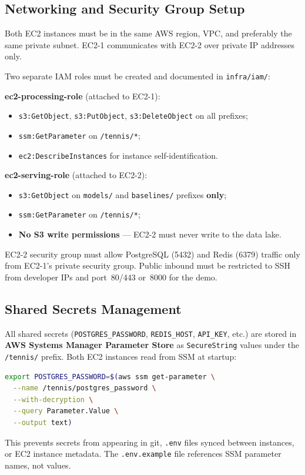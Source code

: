 \documentclass[11pt,a4paper]{article}
\begin{document}
\subsection{Networking and Security Group Setup}

Both EC2 instances must be in the same AWS region, VPC, and preferably the same private subnet.
EC2-1 communicates with EC2-2 over private IP addresses only.

\begin{criticalbox}
Two separate IAM roles must be created and documented in \texttt{infra/iam/}:

\textbf{ec2-processing-role} (attached to EC2-1):
\begin{itemize}[nosep]
  \item \texttt{s3:GetObject}, \texttt{s3:PutObject}, \texttt{s3:DeleteObject} on all prefixes;
  \item \texttt{ssm:GetParameter} on \texttt{/tennis/*};
  \item \texttt{ec2:DescribeInstances} for instance self-identification.
\end{itemize}

\textbf{ec2-serving-role} (attached to EC2-2):
\begin{itemize}[nosep]
  \item \texttt{s3:GetObject} on \texttt{models/} and \texttt{baselines/} prefixes \textbf{only};
  \item \texttt{ssm:GetParameter} on \texttt{/tennis/*};
  \item \textbf{No S3 write permissions} --- EC2-2 must never write to the data lake.
\end{itemize}

EC2-2 security group must allow PostgreSQL (5432) and Redis (6379) traffic only from EC2-1's
private security group. Public inbound must be restricted to SSH from developer IPs and
port~80/443 or~8000 for the demo.
\end{criticalbox}

\subsection{Shared Secrets Management}

\begin{importantbox}
All shared secrets (\texttt{POSTGRES\_PASSWORD}, \texttt{REDIS\_HOST}, \texttt{API\_KEY}, etc.)
are stored in \textbf{AWS Systems Manager Parameter Store} as \texttt{SecureString} values under
the \texttt{/tennis/} prefix. Both EC2 instances read from SSM at startup:

\begin{lstlisting}[language=bash]
export POSTGRES_PASSWORD=$(aws ssm get-parameter \
  --name /tennis/postgres_password \
  --with-decryption \
  --query Parameter.Value \
  --output text)
\end{lstlisting}

This prevents secrets from appearing in git, \texttt{.env} files synced between instances, or
EC2 instance metadata. The \texttt{.env.example} file references SSM parameter names, not values.
\end{importantbox}
\end{document}

